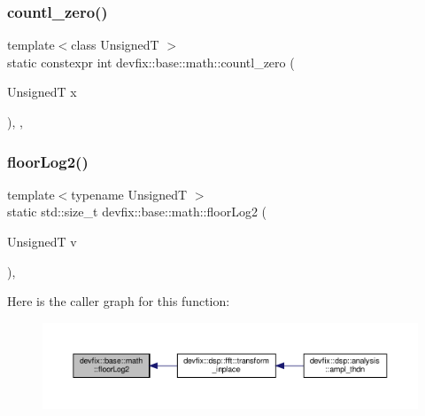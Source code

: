 \subsubsection{\texorpdfstring{countl\+\_\+zero()}{countl\_zero()}}
{\footnotesize\ttfamily template$<$class UnsignedT $>$ \\
static constexpr int devfix\+::base\+::math\+::countl\+\_\+zero (\begin{DoxyParamCaption}\item[{UnsignedT}]{x }\end{DoxyParamCaption})\hspace{0.3cm}{\ttfamily [inline]}, {\ttfamily [static]}, {\ttfamily [noexcept]}}

\mbox{\label{structdevfix_1_1base_1_1math_a8d1fda6ee4b131fffded8562f4f5ad4e}} 
\subsubsection{\texorpdfstring{floor\+Log2()}{floorLog2()}}
{\footnotesize\ttfamily template$<$typename UnsignedT $>$ \\
static std\+::size\+\_\+t devfix\+::base\+::math\+::floor\+Log2 (\begin{DoxyParamCaption}\item[{UnsignedT}]{v }\end{DoxyParamCaption})\hspace{0.3cm}{\ttfamily [inline]}, {\ttfamily [static]}}

Here is the caller graph for this function\+:\nopagebreak
\begin{figure}[H]
\begin{center}
\leavevmode
\includegraphics[width=350pt]{structdevfix_1_1base_1_1math_a8d1fda6ee4b131fffded8562f4f5ad4e_icgraph}
\end{center}
\end{figure}
\mbox{\label{structdevfix_1_1base_1_1math_a43815037f45e01d90a6c0cb0e1d8ef11}} 
